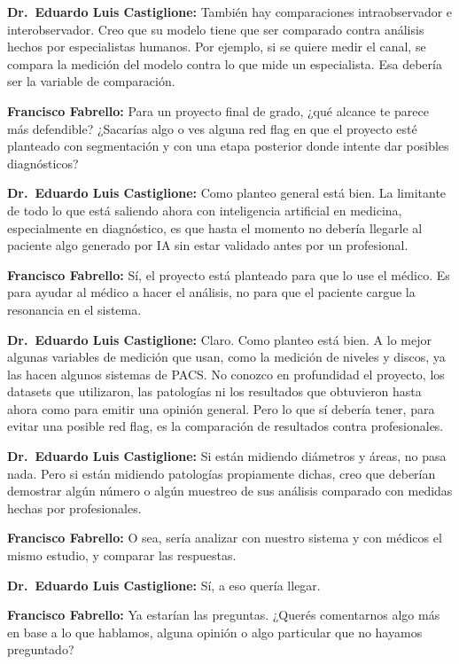 \noindent\textbf{Dr.~Eduardo Luis Castiglione:} También hay comparaciones intraobservador e interobservador. Creo que su modelo tiene que ser comparado contra análisis hechos por especialistas humanos. Por ejemplo, si se quiere medir el canal, se compara la medición del modelo contra lo que mide un especialista. Esa debería ser la variable de comparación.

\noindent\textbf{Francisco Fabrello:} Para un proyecto final de grado, ¿qué alcance te parece más defendible? ¿Sacarías algo o ves alguna red flag en que el proyecto esté planteado con segmentación y con una etapa posterior donde intente dar posibles diagnósticos?

\noindent\textbf{Dr.~Eduardo Luis Castiglione:} Como planteo general está bien. La limitante de todo lo que está saliendo ahora con inteligencia artificial en medicina, especialmente en diagnóstico, es que hasta el momento no debería llegarle al paciente algo generado por IA sin estar validado antes por un profesional.

\noindent\textbf{Francisco Fabrello:} Sí, el proyecto está planteado para que lo use el médico. Es para ayudar al médico a hacer el análisis, no para que el paciente cargue la resonancia en el sistema.

\noindent\textbf{Dr.~Eduardo Luis Castiglione:} Claro. Como planteo está bien. A lo mejor algunas variables de medición que usan, como la medición de niveles y discos, ya las hacen algunos sistemas de PACS. No conozco en profundidad el proyecto, los datasets que utilizaron, las patologías ni los resultados que obtuvieron hasta ahora como para emitir una opinión general. Pero lo que sí debería tener, para evitar una posible red flag, es la comparación de resultados contra profesionales.

\noindent\textbf{Dr.~Eduardo Luis Castiglione:} Si están midiendo diámetros y áreas, no pasa nada. Pero si están midiendo patologías propiamente dichas, creo que deberían demostrar algún número o algún muestreo de sus análisis comparado con medidas hechas por profesionales.

\noindent\textbf{Francisco Fabrello:} O sea, sería analizar con nuestro sistema y con médicos el mismo estudio, y comparar las respuestas.

\noindent\textbf{Dr.~Eduardo Luis Castiglione:} Sí, a eso quería llegar.

\noindent\textbf{Francisco Fabrello:} Ya estarían las preguntas. ¿Querés comentarnos algo más en base a lo que hablamos, alguna opinión o algo particular que no hayamos preguntado?

